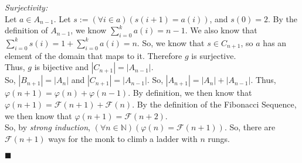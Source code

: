 \documentclass[11pt,a4paper]{article}
\begin{document}
\begin{enumerate}
    \emph{Surjectivity:} \\
    Let $a \in A_{n-1}$. Let $s := (\forall i \in a)(s(i + 1) = a(i))$, and $s(0) = 2$. 
    By the definition of $A_{n-1} $, we know $\sum_{i=0}^{k} a(i) = n-1 $. We also know that $\sum_{i=0}^{k} s(i) = 1 + \sum_{i=0}^{k} a(i) = n $. So, we know that $s \in C_{n+1} $, so $a$ has an element of the domain that maps to it. Therefore $g$ is surjective. \\
    Thus, $g$ is bijective and $|C_{n+1}| = |A_{n-1}| $. \\
    So, $|B_{n+1}| = |A_n|$ and $|C_{n+1}| = |A_{n-1}| $. So, $|A_{n+1} | = |A_n| + |A_{n-1}|$. Thus, $\varphi(n+1) = \varphi(n) + \varphi(n-1) $. 
    By definition, we then know that $\varphi(n+1) = \mathcal{F}(n+1) + \mathcal{F}(n) $. By the definition of the Fibonacci Sequence, we then know that $\varphi(n+1) = \mathcal{F}(n+2)$. \\
    So, by \emph{strong induction}, $(\forall n \in \mathbb{N})(\varphi(n) = \mathcal{F}(n+1)) $. So, there are $\mathcal{F}(n+1) $ ways for the monk to climb a ladder with  $n$ rungs. 
    \begin{flushright}
      $\blacksquare$
    \end{flushright}

\end{enumerate}
\end{document}

